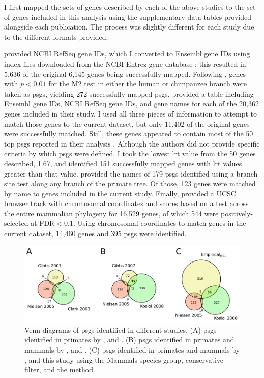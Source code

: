I first mapped the sets of genes described by each of the above
studies to the set of genes included in this analysis using the
supplementary data tables provided alongside each publication. The
process was slightly different for each study due to the different
formats provided.

\citet{Clark2003} provided NCBI RefSeq gene IDs,
which I converted to Ensembl gene IDs using index files downloaded
from the NCBI Entrez gene database \citep{Maglott2005}; this resulted
in 5,636 of the original 6,145 genes being successfully
mapped. Following \citet{Clark2003}, genes with
$p<0.01$ for the M2 test in either the human or chimpanzee branch were
taken as \acp{psg}, yielding 272 successfully mapped
\acp{psg}. \citet{Nielsen2005} provided a table
including Ensembl gene IDs, NCBI RefSeq gene IDs, and gene names for
each of the 20,362 genes included in their study. I used all three
pieces of information to attempt to match those genes to the current
dataset, but only 11,402 of the original genes were successfully
matched. Still, these genes appeared to contain most of the 50 top
\acp{psg} reported in their analysis \citep{Nielsen2005}. Although the
authors did not provide specific criteria by which \acp{psg} were
defined, I took the lowest \ac{lrt} value from the 50 genes described,
1.67, and identified 151 successfully mapped genes with \ac{lrt}
values greater than that value. \citet{Macaque2007} provided the names of
179 \acp{psg} identified using a branch-site test along any branch of
the primate tree. Of those, 123 genes were matched by name to genes
included in the current study. Finally, \citet{Kosiol2008} provided a UCSC browser track with
chromosomal coordinates and scores based on a test across the entire
mammalian phylogeny for 16,529 genes, of which 544 were
positively-selected at FDR$<0.1$. Using chromosomal coordinates to
match genes in the current dataset, 14,460 genes and 395 \acp{psg}
were identified.

\begin{figure}
\centering
\includegraphics[scale=0.3]{Figs/pub_psg_venn.pdf}
\caption{Venn diagrams of \acp{psg} identified in different
  studies. (A) \acp{psg} identified in primates by \citet{Clark2003},
  \citet{Nielsen2005} and \citet{Macaque2007}. (B) \acp{psg}
  identified in primates and mammals by \citet{Nielsen2005},
  \citet{Macaque2007} and \citet{Kosiol2008}. (C) \acp{psg} identified
  in primates and mammals by \citet{Nielsen2005}, \citet{Kosiol2008}
  and this study using the Mammals species group, conservative filter,
  and the \psgeone method.}
\label{fig_pub_psg_venn}
\end{figure}

